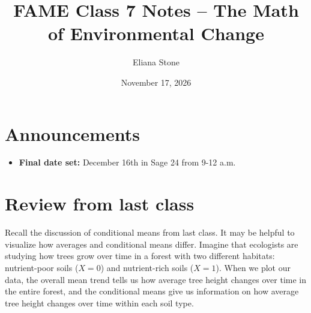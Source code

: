 \documentclass[12pt]{article}
\title{FAME Class 7 Notes -- The Math of Environmental Change}
\author{Eliana Stone}
\date{November 17, 2026}
\begin{document}
\maketitle

\section{Announcements}
\begin{itemize}
    \item \textbf{Final date set:} December 16th in Sage 24 from 9-12 a.m.
\end{itemize}

\section{Review from last class}

Recall the discussion of conditional means from last class. It may be helpful to visualize how averages and conditional means differ. Imagine that ecologists are studying how trees grow over time in a forest with two different habitats: nutrient-poor soils (\(X=0\)) and nutrient-rich soils (\(X=1\)). When we plot our data, the overall mean trend tells us how average tree height changes over time in the entire forest, and the conditional means give us information on how average tree height changes over time within each soil type. 
\end{document}

